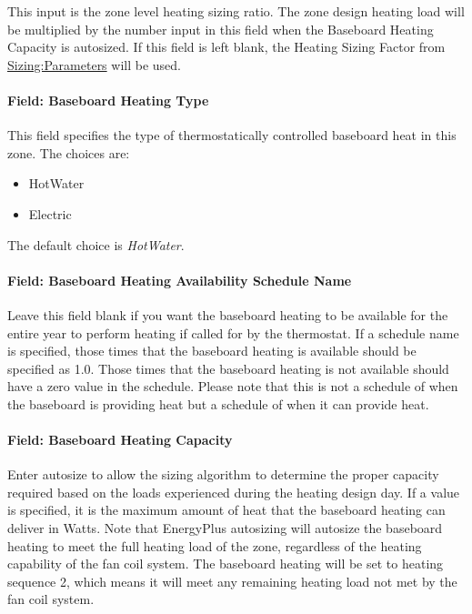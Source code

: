 This input is the zone level heating sizing ratio. The zone design heating load will be multiplied by the number input in this field when the Baseboard Heating Capacity is autosized. If this field is left blank, the Heating Sizing Factor from \hyperref[sizingparameters]{Sizing:Parameters} will be used.

\paragraph{Field: Baseboard Heating Type}\label{field-baseboard-heating-type}

This field specifies the type of thermostatically controlled baseboard heat in this zone. The choices are:

\begin{itemize}
\item
  HotWater
\item
  Electric
\end{itemize}

The default choice is \emph{HotWater}.

\paragraph{Field: Baseboard Heating Availability Schedule Name}\label{field-baseboard-heating-availability-schedule-name}

Leave this field blank if you want the baseboard heating to be available for the entire year to perform heating if called for by the thermostat. If a schedule name is specified, those times that the baseboard heating is available should be specified as 1.0. Those times that the baseboard heating is not available should have a zero value in the schedule. Please note that this is not a schedule of when the baseboard is providing heat but a schedule of when it can provide heat.

\paragraph{Field: Baseboard Heating Capacity}\label{field-baseboard-heating-capacity}

Enter autosize to allow the sizing algorithm to determine the proper capacity required based on the loads experienced during the heating design day. If a value is specified, it is the maximum amount of heat that the baseboard heating can deliver in Watts. Note that EnergyPlus autosizing will autosize the baseboard heating to meet the full heating load of the zone, regardless of the heating capability of the fan coil system. The baseboard heating will be set to heating sequence 2, which means it will meet any remaining heating load not met by the fan coil system.

